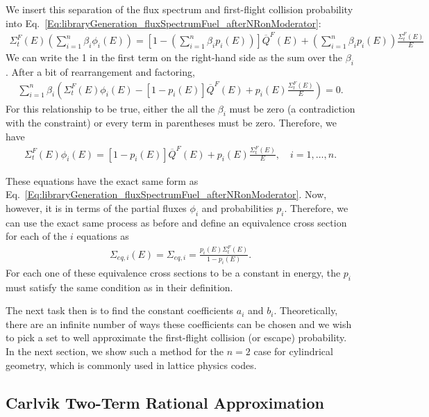 We insert this separation of the flux spectrum and first-flight collision probability into Eq.~\eqref{Eq:libraryGeneration_fluxSpectrumFuel_afterNRonModerator}:
\begin{align}
  \Sigma_t^F(E) \left( \sum_{i=1}^n \beta_i \phi_i(E) \right) = \left[  1 - \left( \sum_{i=1}^n \beta_i p_i(E) \right) \right] \overline{Q}^F(E) +  \left( \sum_{i=1}^n \beta_i p_i(E) \right) \frac{\Sigma_t^F(E)}{E}
\end{align}
We can write the 1 in the first term on the right-hand side as the sum over the $\beta_i$. After a bit of rearrangement and factoring,
\begin{align}
  \sum_{i=1}^n \beta_i \left( \Sigma_t^F(E) \phi_i(E)  -  [  1 - p_i(E) ] \overline{Q}^F(E) + p_i(E) \frac{\Sigma_t^F(E)}{E} \right) = 0.
\end{align}
For this relationship to be true, either the all the $\beta_i$ must be zero (a contradiction with the constraint) or every term in parentheses must be zero. Therefore, we have
\begin{align}
  \Sigma_t^F(E) \phi_i(E) = [  1 - p_i(E) ] \overline{Q}^F(E) + p_i(E) \frac{\Sigma_t^F(E)}{E}, \quad i = 1, \ldots, n .
\end{align}

These equations have the exact same form as Eq.~\eqref{Eq:libraryGeneration_fluxSpectrumFuel_afterNRonModerator}. Now, however, it is in terms of the partial fluxes $\phi_i$ and probabilities $p_i$. Therefore, we can use the exact same process as before and define an equivalence cross section for each of the $i$ equations as
\begin{align}
  \Sigma_{eq,i}(E) = \Sigma_{eq,i} = \frac{ p_i(E) \Sigma_t^F(E) }{ 1 - p_i(E) } .
\end{align}
For each one of these equivalence cross sections to be a constant in energy, the $p_i$ must satisfy the same condition as in their definition. 

The next task then is to find the constant coefficients $a_i$ and $b_i$. Theoretically, there are an infinite number of ways these coefficients can be chosen and we wish to pick a set to well approximate the first-flight collision (or escape) probability. In the next section, we show such a method for the $n = 2$ case for cylindrical geometry, which is commonly used in lattice physics codes.




\subsection{Carlvik Two-Term Rational Approximation}

